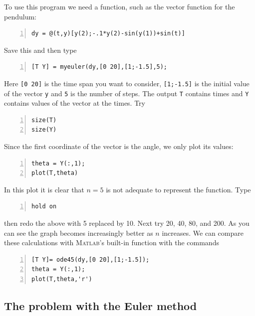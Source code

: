 To use this program we need a function, such as the vector function for
the pendulum:
\begin{lstlisting}[frame=none,numbers=left]
dy = @(t,y)[y(2);-.1*y(2)-sin(y(1))+sin(t)]
\end{lstlisting}
Save this  and then type
\begin{lstlisting}[frame=none,numbers=left]
[T Y] = myeuler(dy,[0 20],[1;-1.5],5);
\end{lstlisting}
Here \verb&[0 20]& is the time span you want to consider, \verb&[1;-1.5]& is
the initial value of the vector \verb&y& and \verb&5& is the number of steps.
The output \verb&T& contains times
and \verb&Y& contains values of the vector at the times. Try
\begin{lstlisting}[frame=none,numbers=left]
size(T)
size(Y)
\end{lstlisting}
Since the first coordinate of the vector is the angle, we only plot its values:
\begin{lstlisting}[frame=none,numbers=left]
theta = Y(:,1);
plot(T,theta)
\end{lstlisting}
In this plot it is clear that $n=5$ is not adequate to represent the function.
Type
\begin{lstlisting}[frame=none,numbers=left]
hold on
\end{lstlisting}
then redo the above with 5 replaced by 10. Next try 20, 40, 80, and 200.
As you can see the graph becomes increasingly better as $n$ increases.
We can compare these calculations with \textsc{Matlab}'s built-in function
with the commands
\begin{lstlisting}[frame=none,numbers=left]
[T Y]= ode45(dy,[0 20],[1;-1.5]);
theta = Y(:,1);
plot(T,theta,'r')
\end{lstlisting}


\subsection*{The problem with the Euler method}

